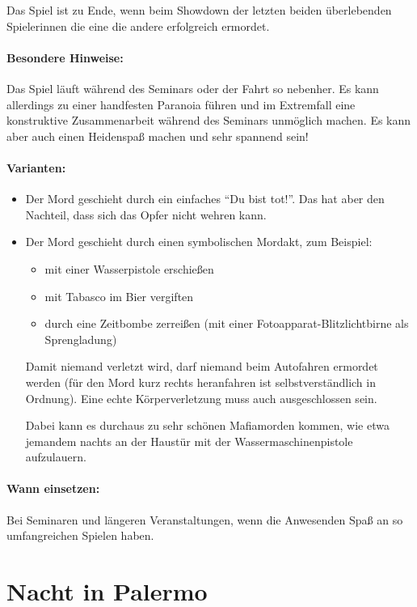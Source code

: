 Das Spiel ist zu Ende, wenn beim Showdown der letzten beiden überlebenden Spielerinnen die eine die andere erfolgreich ermordet.
\paragraph{Besondere Hinweise:} Das Spiel läuft während des Seminars oder der Fahrt so nebenher. Es kann allerdings zu einer handfesten Paranoia führen und im Extremfall eine konstruktive Zusammenarbeit während des Seminars unmöglich machen. Es kann aber auch einen Heidenspaß machen und sehr spannend sein!
\paragraph{Varianten:}\begin{itemize}
    \item Der Mord geschieht durch ein einfaches "`Du bist tot!"'. Das hat aber den Nachteil, dass sich das Opfer nicht wehren kann.
    \item Der Mord geschieht durch einen symbolischen Mordakt, zum Beispiel:
      \begin{itemize}
        \item mit einer Wasserpistole erschießen
        \item mit Tabasco im Bier vergiften
        \item durch eine Zeitbombe zerreißen (mit einer Fotoapparat-Blitz\-licht\-birne als Sprengladung)
      \end{itemize}
    Damit niemand verletzt wird, darf niemand beim Autofahren ermordet werden (für den Mord kurz rechts heranfahren ist selbstverständlich in Ordnung). Eine echte Körperverletzung muss auch ausgeschlossen sein.

    Dabei kann es durchaus zu sehr schönen Mafiamorden kommen, wie etwa jemandem nachts an der Haustür mit der Wassermaschinenpistole aufzulauern.
  \end{itemize}
\paragraph{Wann einsetzen:} Bei Seminaren und längeren Veranstaltungen, wenn die Anwesenden Spaß an so umfangreichen Spielen haben.


\section{Nacht in Palermo}
